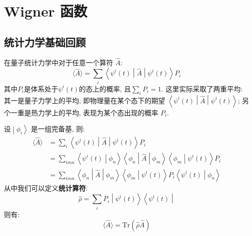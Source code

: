 \chapter{Wigner 函数}
    \section{统计力学基础回顾}

        在量子统计力学中对于任意一个算符 $\hat{A}$: 
        \begin{equation}
            \langle {\hat{A}} \rangle = \sum_i \left\langle {\psi^{i}(t)} \middle| {\hat{A}} \middle| {\psi^{i}(t)} \right\rangle P_{i}
        \end{equation}
        其中$P_i$是体系处于$\psi^{i}(t)$的态上的概率, 且$\sum_i P_i = 1$. 
        这里实际采取了两重平均: 其一是量子力学上的平均, 即物理量在某个态下的期望
        $\left\langle {\psi^{i}(t)} \middle| {\hat{A}} \middle| {\psi^{i}(t)} \right\rangle$; 
        另个一重是热力学上的平均, 表现为某个态出现的概率 $P_{i}$. 

        设$\left. \middle| {\phi_{i}} \right\rangle$ 是一组完备基, 则:
        \begin{equation}\begin{aligned}
            \langle {\hat{A}} \rangle
            &= \sum_i \left\langle {\psi^{i}(t)} \middle| {\hat{A}} \middle| {\psi^{i}(t)} \right\rangle P_{i}
            \\
            &= \sum_{imn} \left\langle {\psi^{i}(t)} \middle| {\phi_{n}} \right\rangle \left\langle {\phi_{n}} \middle| {\hat{A}} \middle| {\phi_{m}} \right\rangle \left\langle {\phi_{m}} \middle| {\psi^{i}(t)} \right\rangle P_{i}
            \\
            &= \sum_{imn} \left\langle {\phi_{n}} \middle| {\hat{A}} \middle| {\phi_{m}} \right\rangle 
            \left\langle {\phi_{m}} \middle| {\psi^{i}(t)} \right\rangle P_{i}
            \left\langle {\psi^{i}(t)} \middle| {\phi_{n}} \right\rangle
        \end{aligned}\end{equation}
        从中我们可以定义\textbf{统计算符}: 
        \begin{equation}
            \hat{\rho} = \sum_i P_{i} \left. \middle| {\psi^{i}(t)} \right\rangle \left\langle {\psi^{i}(t)} \middle| \right.
        \end{equation}
        则有:
        \begin{equation}
            \langle {\hat{A}} \rangle = \mathrm{Tr}(\hat{\rho}\hat{A})
        \end{equation}

